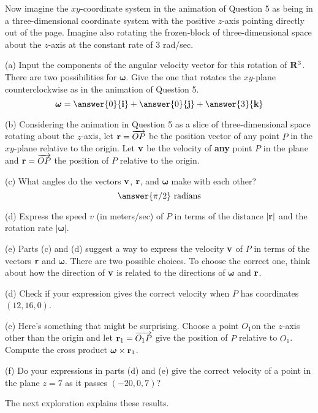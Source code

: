 \documentclass{ximera}
\begin{document}
\begin{question}  \label{Qhfnbyt:Cross}
Now imagine the $xy$-coordinate system in the animation of Question 5  as being in a three-dimensional coordinate system with the positive $z$-axis pointing directly out of the page. Imagine also rotating the frozen-block of three-dimensional space about the $z$-axis at the constant rate of $3$ rad/sec. 


(a) Input the components of the angular velocity vector for this rotation of ${\bf R}^3$. There are two possibilities for $\boldsymbol{\omega}$. Give the one that rotates the $xy$-plane counterclockwise as in the animation of Question 5. 
\[
\boldsymbol{\omega} = \answer{0}{\bf i} + \answer{0}{\bf j} + \answer{3}{\bf k}
\]

(b) Considering the animation in Question 5 as a slice of three-dimensional space rotating about the $z$-axis, let ${\bf r} = \overrightarrow{OP}$ be the position vector of any point $P$ in the $xy$-plane relative to the origin. Let ${\bf v}$ be the velocity of {\bf any} point $P$ in the plane and ${\bf r} = \overrightarrow{OP}$ the position of $P$ relative to the origin.

(c) What angles do the vectors ${\bf v}$,  ${\bf r}$, and $\boldsymbol{\omega}$ make with each other?
\[
     \answer{\pi/2}\text{ radians}
\]

(d) Express the speed $v$ (in meters/sec) of $P$ in terms of the distance $|{\bf r}|$ and the rotation rate $|\boldsymbol{\omega}|$.

(e) Parts (c) and (d) suggest a way to express the velocity ${\bf v}$ of $P$ in terms of the vectors ${\bf r}$ and $\boldsymbol{\omega}$.
There are two possible choices. To choose the correct one, think about how the direction of ${\bf v}$ is related to the directions of $\boldsymbol{\omega}$ and ${\bf r}$. 

\begin{multipleChoice}  
\end{multipleChoice}  


(d) Check if your expression gives the correct velocity when $P$ has coordinates $(12, 16,0)$.

(e) Here's something that might be surprising. Choose a point $O_1$on the $z$-axis other than the origin and let ${\bf r}_1 = \overrightarrow{O_1P}$ give the position of $P$ relative to $O_1$. Compute the cross product $\boldsymbol{\omega} \times {\bf r}_1$. 

(f) Do your expressions in parts (d) and (e) give the correct velocity of a point in the plane $z=7$ as it passes $(-20,0,7)$?

The next exploration explains these results.

\end{question}
\end{document}
